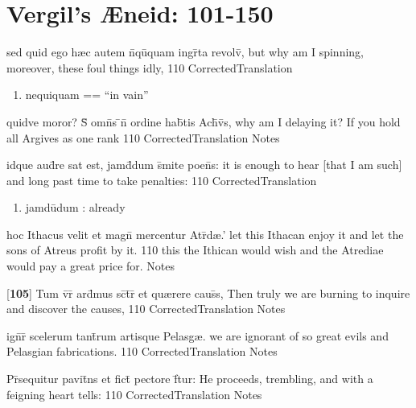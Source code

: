 \section{Vergil's {\AE}neid: 101-150} %

\latline
  {sed quid ego h{\ae}c autem n\={}qu\={\macron {\i}}quam ingr\={}ta revolv\={},}
  { but why am I spinning, moreover, these foul things idly, }
  {110}
  { CorrectedTranslation }
  { \begin{enumerate}
  	\item nequiquam == ``in vain''
  \end{enumerate} }


\latline
  {quidve moror?  S\={\macron {\i}} omn\={\macron {\i}}s \={}n\={} ordine hab\={}tis Ach\={\macron {\i}}v\={}s,}
  { why am I delaying it?  If you hold all Argives as one rank }
  {110}
  { CorrectedTranslation }
  { Notes }


\latline
  {idque aud\={\macron {\i}}re sat est, jamd\={}dum s\={}mite poen\={}s:}
  { it is enough to hear [that I am such] and long past time to take penalties: }
  {110}
  { CorrectedTranslation }
  { \begin{enumerate}
  	\item jamd\={u}dum :  already
  \end{enumerate} }


\latline
  {hoc Ithacus velit et magn\={} mercentur Atr\={\macron {\i}}d{\ae}.'}
  { let this Ithacan enjoy it and let the sons of Atreus profit by it. }
  {110}
  { this the Ithican would wish and the Atrediae would pay a great price for.  }
  { Notes }


\latline
  {[\textbf{105}] Tum v\={}r\={} ard\={}mus sc\={\macron {\i}}t\={}r\={\macron {\i}} et qu{\ae}rere caus\={}s,}
  { Then truly we are burning to inquire and discover the causes, }
  {110}
  { CorrectedTranslation }
  { Notes }


\latline
  {ign\={}r\={\macron {\i}} scelerum tant\={}rum artisque Pelasg{\ae}.}
  { we are ignorant of so great evils and Pelasgian fabrications.  }
  {110}
  { CorrectedTranslation }
  { Notes }


\latline
  {Pr\={}sequitur pavit\={}ns et fict\={} pectore f\={}tur:}
  { He proceeds, trembling, and with a feigning heart tells: }
  {110}
  { CorrectedTranslation }
  { Notes }


